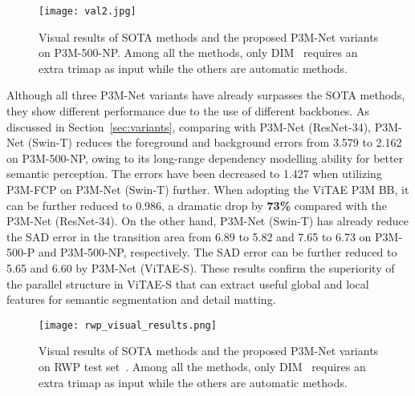 \documentclass[twocolumn]{svjour3}
\begin{document}
\begin{figure*}[hbtp]
    \centering
    \texttt{[image: val2.jpg]}
    \caption{Visual results of SOTA methods and the proposed P3M-Net variants on P3M-500-NP. Among all the methods, only DIM~\citep{dim} requires an extra trimap as input while the others are automatic methods.}
    \label{fig:variants_compare_results_val500np}
\end{figure*}

Although all three P3M-Net variants have already surpasses the SOTA methods, they show different performance due to the use of different backbones. As discussed in Section~\ref{sec:variants}, comparing with P3M-Net (ResNet-34), P3M-Net (Swin-T) reduces the foreground and background errors from 3.579 to 2.162 on P3M-500-NP, owing to its long-range dependency modelling ability for better semantic perception. The errors have been decreased to 1.427 when utilizing P3M-FCP on P3M-Net (Swin-T) further. When adopting the ViTAE P3M BB, it can be further reduced to 0.986, a dramatic drop by \textbf{73\%} compared with the P3M-Net (ResNet-34). On the other hand, P3M-Net (Swin-T) has already reduce the SAD error in the transition area from 6.89 to 5.82 and 7.65 to 6.73 on P3M-500-P and P3M-500-NP, respectively. The SAD error can be further reduced to 5.65 and 6.60 by P3M-Net (ViTAE-S). These results confirm the superiority of the parallel structure in ViTAE-S that can extract useful global and local features for semantic segmentation and detail matting.



\begin{figure*}[hbtp]
    \centering
    \texttt{[image: rwp\_visual\_results.png]}
    \caption{Visual results of SOTA methods and the proposed P3M-Net variants on RWP test set~\citep{yu2021mask}. Among all the methods, only DIM~\citep{dim} requires an extra trimap as input while the others are automatic methods.}
    \label{fig:variants_compare_results_realworld}
\end{figure*}
\end{document}
